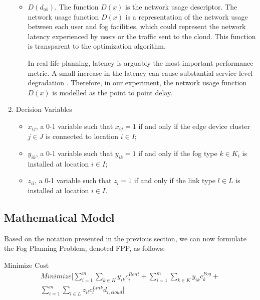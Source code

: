\documentclass[10pt,journal,compsoc]{IEEEtran}
\begin{document}
\begin{enumerate}
\begin{itemize}
\item$D(d_{ab})$. The function $D(x)$ is the network usage descriptor. The network usage function $D(x)$ is a representation of the network usage between each user and fog facilities, which could represent the network latency experienced by users or the traffic sent to the cloud. This function is transparent to the optimization algorithm. %

In real life planning, latency is arguably the most important performance metric. A small increase in the latency can cause substantial service level degradation \cite{7833029,6678113}. Therefore, in our experiment, the network usage function $D(x)$ is modelled as the point to point delay. 

\end{itemize}
\item Decision Variables
\begin{itemize}
\item $x_{ij}$, a 0-1 variable such that $x_{ij} = 1$ if and only if the edge device cluster $j \in J$ is connected to location $i\in I $;
\item $y_{ik}$, a 0-1 variable such that $y_{ik} = 1$ if and only if the fog type $k \in K_i$ is installed at location $i \in I$;
\item $z_{il}$, a 0-1 variable such that $z_{l}=1$ if and only if the link type $l \in L$ is installed at location $i \in I $. 
\end{itemize}
\end{enumerate}


\subsection{Mathematical Model}\label{obj}
Based on the notation presented in the previous section, we can now formulate the Fog Planning Problem, denoted FPP, as follows:

Minimize Cost
\begin{equation}\label{obj1}
\begin{aligned}
\textit{Minimize}\bigg[\sum_{i=1}^{m}\sum_{k\in K} y_{ik}c^{Rent}_i +\sum_{i=1}^{m}\sum_{k\in K}  y_{ik} c^{Fog}_k +\\
\sum_{i=1}^m \sum_{l\in L} z_{il} c^{Link}_l d_{i,cloud}\bigg] %
\end{aligned}
\end{equation}
\end{document}

